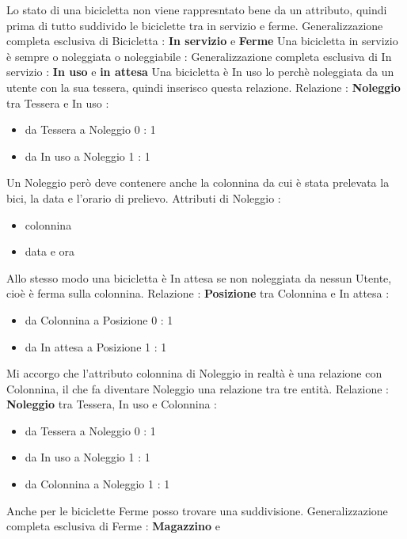 \documentclass[a4paper,twoside]{article}
\begin{document}
Lo stato di una bicicletta non viene rappresntato bene da un attributo, quindi prima di tutto suddivido le biciclette tra in servizio e ferme.\newline
Generalizzazione completa esclusiva di Bicicletta : \textbf{In servizio} e \textbf{Ferme}\newline
Una bicicletta in servizio è sempre o noleggiata o noleggiabile :\newline
Generalizzazione completa esclusiva di In servizio : \textbf{In uso} e \textbf{in attesa}\newline
Una bicicletta è In uso lo perchè noleggiata da un utente con la sua tessera, quindi inserisco questa relazione.\newline
Relazione : \textbf{Noleggio} tra Tessera e In uso :
\begin{itemize}
 \item da Tessera a Noleggio 0 : 1
 \item da In uso a Noleggio 1 : 1
\end{itemize}
Un Noleggio però deve contenere anche la colonnina da cui è stata prelevata la bici, la data e l'orario di prelievo.\newline
Attributi di Noleggio :
\begin{itemize}
 \item colonnina
 \item data e ora
\end{itemize}
Allo stesso modo una bicicletta è In attesa se non noleggiata da nessun Utente, cioè è ferma sulla colonnina.\newline
Relazione : \textbf{Posizione} tra Colonnina e In attesa :
\begin{itemize}
 \item da Colonnina a Posizione 0 : 1
 \item da In attesa a Posizione 1 : 1
\end{itemize}
Mi accorgo che l'attributo colonnina di Noleggio in realtà è una relazione con Colonnina, il che fa diventare Noleggio una relazione tra tre entità.\newline
Relazione : \textbf{Noleggio} tra Tessera, In uso e Colonnina :
\begin{itemize}
 \item da Tessera a Noleggio 0 : 1
 \item da In uso a Noleggio 1 : 1
 \item da Colonnina a Noleggio 1 : 1
\end{itemize}
Anche per le biciclette Ferme posso trovare una suddivisione.\newline
Generalizzazione completa esclusiva di Ferme : \textbf{Magazzino} e 
\end{document}
